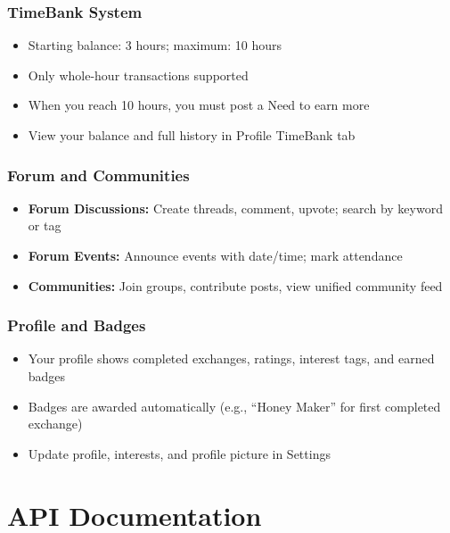 \documentclass[10pt,a4paper]{report}
\begin{document}
\subsection{TimeBank System}

\begin{itemize}
    \item Starting balance: 3 hours; maximum: 10 hours
    \item Only whole-hour transactions supported
    \item When you reach 10 hours, you must post a Need to earn more
    \item View your balance and full history in Profile \textrightarrow{} TimeBank tab
\end{itemize}

\subsection{Forum and Communities}

\begin{itemize}
    \item \textbf{Forum Discussions:} Create threads, comment, upvote; search by keyword or tag
    \item \textbf{Forum Events:} Announce events with date/time; mark attendance
    \item \textbf{Communities:} Join groups, contribute posts, view unified community feed
\end{itemize}

\subsection{Profile and Badges}

\begin{itemize}
    \item Your profile shows completed exchanges, ratings, interest tags, and earned badges
    \item Badges are awarded automatically (e.g., ``Honey Maker'' for first completed exchange)
    \item Update profile, interests, and profile picture in Settings
\end{itemize}

\chapter{API Documentation}
\end{document}
